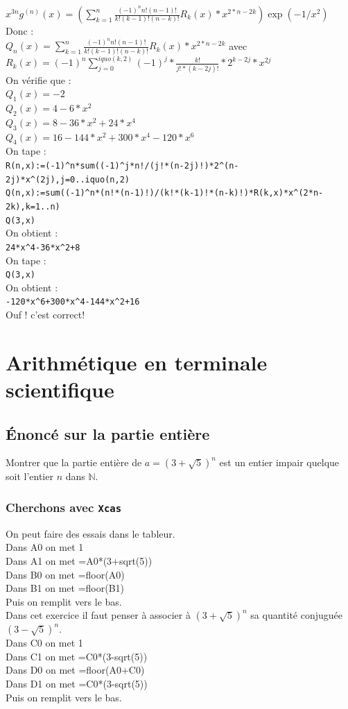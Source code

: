 \documentclass[a4paper,11pt]{book}
\begin{document}
$x^{3n}g^(n)(x)=(\sum_{k=1}^n\frac{(-1)^nn!(n-1)!}{k!(k-1)!(n-k)!}R_k(x)*x^{2*n-2k})\exp(-1/x^2)$\\
Donc :\\
$Q_n(x)=\sum_{k=1}^n\frac{(-1)^nn!(n-1)!}{k!(k-1)!(n-k)!}R_k(x)*x^{2*n-2k}$ avec\\
$R_k(x)=(-1)^n\sum_{j=0}^{iquo(k,2)}(-1)^{j}*\frac{k!}{j!*(k-2j)!}*2^{k-2j}*x^{2j}$
\\
On v\'erifie que :\\
$Q_1(x)=-2$\\
$Q_2(x)=4-6*x^2$\\
$Q_3(x)=8-36*x^2+24*x^4$\\
$Q_4(x)=16-144*x^2+300*x^4-120*x^6$\\
On tape :\\
{\tt R(n,x):=(-1)\verb|^|n*sum((-1)\verb|^|j*n!/(j!*(n-2j)!)*2\verb|^|(n-2j)*x\verb|^|(2j),j=0..iquo(n,2)}\\
{\tt Q(n,x):=sum((-1)\verb|^|n*(n!*(n-1)!)/(k!*(k-1)!*(n-k)!)*R(k,x)*x\verb|^|(2*n-2k),k=1..n)}\\
{\tt Q(3,x)}\\
On obtient :\\
{\tt 24*x\verb|^|4-36*x\verb|^|2+8}\\
On tape :\\
{\tt Q(3,x)}\\
On obtient :\\
{\tt -120*x\verb|^|6+300*x\verb|^|4-144*x\verb|^|2+16}\\
Ouf ! c'est correct!

\chapter{Arithm\'etique en terminale scientifique}
\section{\'Enonc\'e sur la partie enti\`ere}
Montrer que la partie enti\`ere de $a=(3+\sqrt 5)^n$ est un entier impair 
quelque soit l'entier $n$ dans $\mathbb N$. 
\subsection{Cherchons avec {\tt Xcas}}
On peut faire des essais dans le tableur.\\
Dans A0 on met 1\\
Dans A1 on met =A0*(3+sqrt(5))\\ 
Dans B0 on met =floor(A0)\\
Dans B1 on met =floor(B1)\\
Puis on remplit vers le bas.\\
Dans cet exercice il faut penser \`a associer \`a
$(3+\sqrt 5)^n$ sa quantit\'e conjugu\'ee $(3-\sqrt 5)^n$.\\
Dans C0 on met 1\\
Dans C1 on met =C0*(3-sqrt(5))\\ 
Dans D0 on met =floor(A0+C0)\\
Dans D1 on met =C0*(3-sqrt(5))\\ 
Puis on remplit vers le bas.
\end{document}
